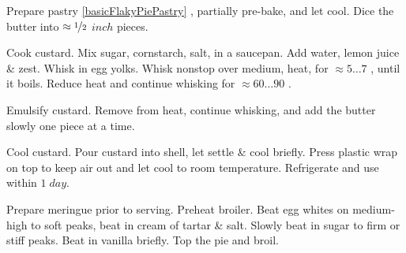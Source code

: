 \begin{preparation}
\item Prepare pastry \ref{basicFlakyPiePastry} , partially pre-bake, and let cool.
	Dice the butter into $\approx\nicefrac{1}{2}$ $inch$ pieces.

\item Cook custard.
	Mix sugar, cornstarch, salt, in a saucepan.
	Add water, lemon juice \& zest.
	Whisk in egg yolks.
	Whisk nonstop over medium, heat, for $\approx 5\dots7$ \minute, until it boils.
	Reduce heat and continue whisking for $\approx 60 \dots 90$ \second.

\item Emulsify custard.
	Remove from heat, continue whisking, and add the butter slowly one piece at a time.

\item Cool custard.
	Pour custard into shell, let settle \& cool briefly.
	Press plastic wrap on top to keep air out and let cool to room temperature.
	Refrigerate and use within $1\; day$.

\item Prepare meringue prior to serving.
	Preheat broiler.
	Beat egg whites on medium-high to soft peaks, beat in cream of tartar \& salt.
	Slowly beat in sugar to firm or stiff peaks.
	Beat in vanilla briefly. Top the pie and broil.
\end{preparation}


\recipeend
